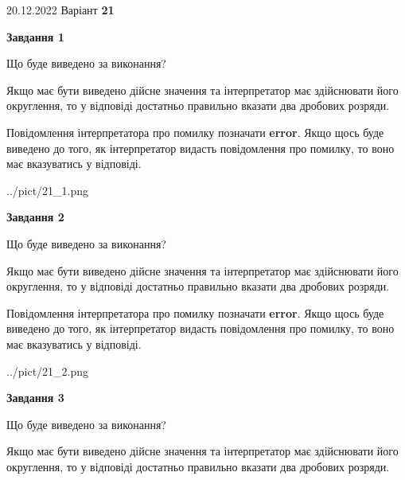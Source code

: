 \documentclass[12pt, ukrainian]{article}
\begin{document}
{20.12.2022 Варіант \No \textbf { 21 }\par}
{
\begin {Large}

{\begin {center}\textbf{Завдання 1}\end {center}}\par
Що буде виведено за виконання? \par

Якщо має бути виведено дійсне значення та інтерпретатор має здійснювати його округлення, 
то у відповіді достатньо правильно вказати два дробових розряди.

Повідомлення інтерпретатора про помилку позначати \textbf{error}.
Якщо щось буде виведено до того, як інтерпретатор видасть повідомлення про помилку, 
то воно має вказуватись у відповіді. \par

\begin{center}
	{../pict/21_1.png}
\end{center}
\newpage

{\begin {center}\textbf{Завдання 2}\end {center}}\par
Що буде виведено за виконання? \par

Якщо має бути виведено дійсне значення та інтерпретатор має здійснювати його округлення, 
то у відповіді достатньо правильно вказати два дробових розряди.

Повідомлення інтерпретатора про помилку позначати \textbf{error}.
Якщо щось буде виведено до того, як інтерпретатор видасть повідомлення про помилку, 
то воно має вказуватись у відповіді. \par

\begin{center}
	{../pict/21_2.png}
\end{center}
\newpage

{\begin {center}\textbf{Завдання 3}\end {center}}\par
Що буде виведено за виконання? \par

Якщо має бути виведено дійсне значення та інтерпретатор має здійснювати його округлення, 
то у відповіді достатньо правильно вказати два дробових розряди.


\end{Large}}
\end{document}
